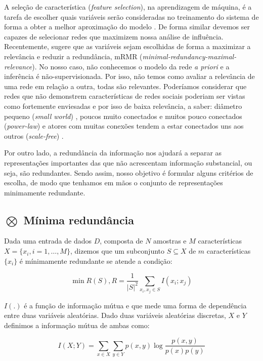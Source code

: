 A seleção de característica (\emph{feature selection}), na aprendizagem de
máquina, é a tarefa de escolher quais variáveis serão consideradas no treinamento
do sistema de forma a obter a melhor aproximação do modelo \citep{Jain1997,
Blum1997, Jain2000}. De forma similar devemos ser capazes de selecionar redes que
maximizem nossa análise de influência. Recentemente, \citet{Peng2005} sugere que
as variáveis sejam escolhidas de forma a maximizar a relevância e reduzir a
redundância, mRMR (\emph{minimal-redundancy-maximal-relevance}). No nosso caso,
não conhecemos o modelo da rede \emph{a priori} e a inferência é
não-supervisionada. Por isso, não temos como avaliar a relevância de uma rede em
relação a outra, todas são relevantes. Poderíamos considerar que redes que não
demonstrem características de redes sociais poderiam ser vistas como fortemente
enviesadas e por isso de baixa relevância, a saber: diâmetro pequeno (\emph{small
world}) \citep{Milgram1967, Watts1998}, poucos muito conectados e muitos pouco
conectados (\emph{power-law}) \citep{Liljeros2001, Mitzenmacher2004} e atores com
muitas conexões tendem a estar conectados uns aos outros (\emph{scale-free})
\citep{Li2005}.

Por outro lado, a redundância da informação nos ajudará a separar as
representações importantes das que não acrescentam informação substancial, ou
seja, são redundantes. Sendo assim, nosso objetivo é formular alguns critérios
de escolha, de modo que tenhamos em mãos o conjunto de representações
minimamente redundante.

\subsection{$\bigotimes$ Mínima redundância}

Dada uma entrada de dados $D$, composta de $N$ amostras e $M$
características $X=\{x_i, i=1,\ldots,M\}$, dizemos que um subconjunto $S
\subseteq X$ de $m$ características $\{x_i\}$ é mínimamente redundante se atende
a condição:

\begin{equation}
\label{def:min_redun}
\min R(S), R = \frac{1}{|S|^2}\sum_{x_i, x_j \in S}I(x_i;x_j)
\end{equation}

$I(.)$ é a função de informação mútua e que mede uma forma de dependência entre
duas variáveis aleatórias. Dado duas variáveis aleatórias discretas, $X$ e $Y$
definimos a informação mútua de ambas como:

\begin{equation}
\label{def:inf_mutua}
I(X;Y) = \sum_{x\in X}\sum_{y\in Y}p(x,y)\log \frac{p(x,y)}{p(x)p(y)}
\end{equation}

